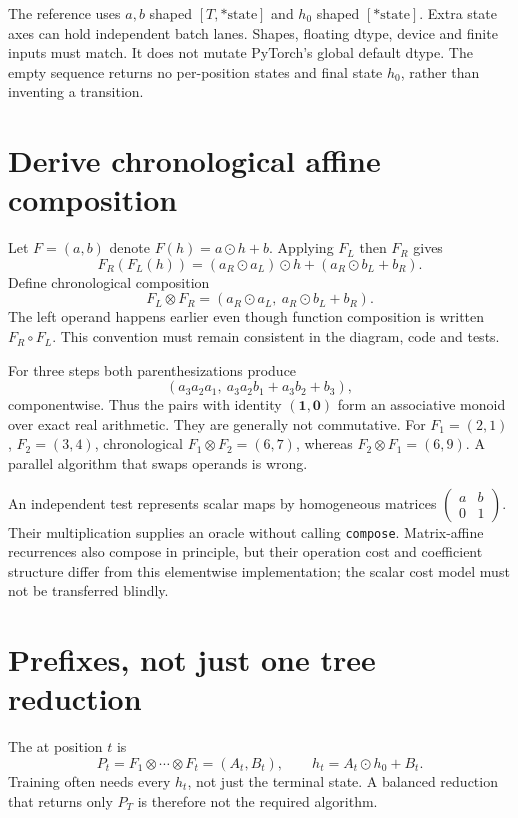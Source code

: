 The reference uses $a,b$ shaped $[T,*\mathrm{state}]$ and $h_0$ shaped
$[*\mathrm{state}]$. Extra state axes can hold independent batch lanes.
Shapes, floating dtype, device and finite inputs must match. It does not mutate
PyTorch's global default dtype. The empty sequence returns no per-position states
and final state $h_0$, rather than inventing a transition.

\section{Derive chronological affine composition}
Let $F=(a,b)$ denote $F(h)=a\odot h+b$. Applying $F_L$ then $F_R$ gives
\[
F_R(F_L(h))=(a_R\odot a_L)\odot h+(a_R\odot b_L+b_R).
\]
Define chronological composition
\begin{equation}
F_L\otimes F_R=(a_R\odot a_L,\ a_R\odot b_L+b_R).
\label{evod26:composition}
\end{equation}
The left operand happens earlier even though function composition is written
$F_R\circ F_L$. This convention must remain consistent in the diagram, code and tests.

For three steps both parenthesizations produce
\[
(a_3a_2a_1,\ a_3a_2b_1+a_3b_2+b_3),
\]
componentwise. Thus the pairs with identity $(\mathbf1,\mathbf0)$ form an
associative monoid over exact real arithmetic. They are generally not commutative.
For $F_1=(2,1)$, $F_2=(3,4)$, chronological $F_1\otimes F_2=(6,7)$,
whereas $F_2\otimes F_1=(6,9)$. A parallel algorithm that swaps operands is wrong.

An independent test represents scalar maps by homogeneous matrices
$\begin{pmatrix}a&b\\0&1\end{pmatrix}$. Their multiplication supplies an oracle
without calling \texttt{compose}. Matrix-affine recurrences also compose in
principle, but their operation cost and coefficient structure differ from this
elementwise implementation; the scalar cost model must not be transferred blindly.

\section{Prefixes, not just one tree reduction}
The  at position $t$ is
\[
P_t=F_1\otimes\cdots\otimes F_t=(A_t,B_t),\qquad
h_t=A_t\odot h_0+B_t.
\]
Training often needs every $h_t$, not just the terminal state. A balanced reduction
that returns only $P_T$ is therefore not the required algorithm.


